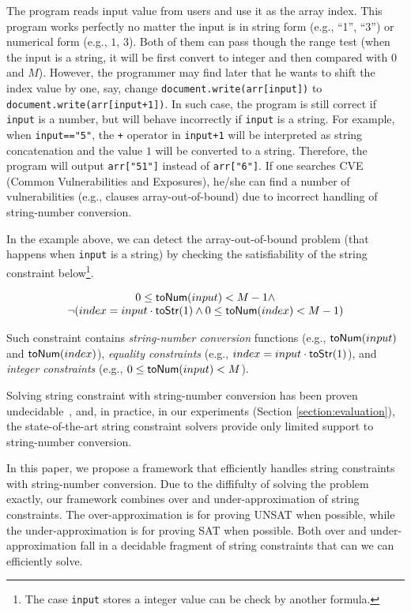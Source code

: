 \documentclass[sigplan,review,anonymous]{acmart}\settopmatter{printfolios=true,printccs=false,printacmref=false}
\begin{document}
{The program reads input value from users and use it as the array index. This program works perfectly no matter the input is in string form (e.g., ``1'', ``3'') or numerical form (e.g., $1$, $3$). Both of them can pass though the range test (when the input is a string, it will be first convert to integer and then compared with $0$ and $M$). However, the programmer may find later that he wants to shift the index value by one, say, change \texttt{document.write(arr[input])} to \texttt{document.write(arr[input+1])}. In such case, the program is still correct if \texttt{input} is a number, but will behave incorrectly if \texttt{input} is a string. For example, when \texttt{input=="5"}, the \texttt{+} operator in \texttt{input+1} will be interpreted as string concatenation and the value $1$ will be converted to a string. Therefore, the program will output \texttt{arr["51"]} instead of \texttt{arr["6"]}. If one searches CVE (Common Vulnerabilities and Exposures), he/she can find a number of vulnerabilities (e.g., clauses array-out-of-bound) due to incorrect handling of string-number conversion.

In the example above, we can detect the array-out-of-bound problem (that happens when \texttt{input} is a string) by checking the satisfiability of the string constraint below\footnote{The case \texttt{input} stores a integer value can be check by another formula.}. 

$$
\begin{array}{c}
0 \leq \mbox{\textsf{toNum}($input$)}<M-1 \wedge \\
\neg(index = input\cdot \mbox{\textsf{toStr}($1$)} \wedge 0 \leq \mbox{\textsf{toNum}($index$)} <M-1)
\end{array}
$$


Such constraint contains \textit{string-number conversion} functions (e.g., $\mbox{\textsf{toNum}($input$)}$ and $\mbox{\textsf{toNum}($index$)}$), \textit{equality constraints} (e.g., $index = input\cdot \mbox{\textsf{toStr}($1$)}$), and \textit{integer constraints} (e.g., $0 \leq \mbox{\textsf{toNum}($input$)}<M$). }

Solving string constraint with string-number conversion has been proven undecidable~\cite{day2018satisfiability}, and, in practice, in our experiments (Section \ref{section:evaluation}), the state-of-the-art string constraint solvers provide only limited support to string-number conversion. 

In this paper, we propose a framework that efficiently handles string constraints with string-number conversion. Due to the diffifulty of solving the problem exactly, our framework combines over and under-approximation of string constraints. The over-approximation is for proving UNSAT when possible, while the under-approximation is for proving SAT when possible. Both over and under-approximation fall in a decidable fragment of string constraints that can we can efficiently solve.
\end{document}
